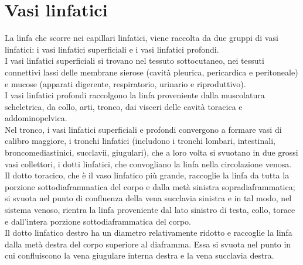 \section{Vasi linfatici}
La linfa che scorre nei capillari linfatici, viene raccolta da due gruppi di vasi linfatici: i vasi linfatici 
superficiali e i vasi linfatici profondi.\\ 
I vasi linfatici superficiali si trovano nel tessuto sottocutaneo, nei tessuti connettivi lassi delle membrane sierose 
(cavità pleurica, pericardica e peritoneale) e mucose (apparati digerente, respiratorio, urinario e riproduttivo).\\ 
I vasi linfatici profondi raccolgono la linfa proveniente dalla muscolatura scheletrica, da collo, arti, tronco, 
dai visceri delle cavità toracica e addominopelvica\cite{BOOK1}.\\
Nel tronco, i vasi linfatici superficiali e profondi convergono a formare vasi di calibro maggiore, 
i tronchi linfatici (includono i tronchi lombari, intestinali, broncomediastinici, succlavii, giugulari), 
che a loro volta si svuotano in due grossi vasi collettori, i dotti linfatici, che convogliano la linfa 
nella circolazione venosa.\\  
Il dotto toracico, che è il vaso linfatico più grande, raccoglie la linfa da tutta la porzione sottodiaframmatica 
del corpo e dalla metà sinistra sopradiaframmatica; si svuota nel punto di confluenza della vena succlavia sinistra e 
in tal modo, nel sistema venoso, rientra la linfa proveniente dal lato sinistro di testa, collo, torace e 
dall’intera porzione sottodiaframmatica del corpo.\\ 
Il dotto linfatico destro ha un diametro relativamente ridotto e raccoglie la linfa dalla metà destra 
del corpo superiore al diaframma. Essa si svuota nel punto in cui confluiscono la vena giugulare interna destra e la 
vena succlavia destra\cite{BOOK1}.
 
